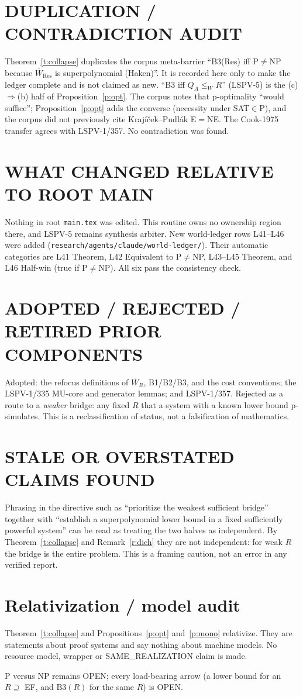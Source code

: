 \documentclass[11pt]{article}
\theoremstyle{definition}
\theoremstyle{remark}
\newcommand{\Wbar}{\overline{W}}
\begin{document}
\section*{DUPLICATION / CONTRADICTION AUDIT}
Theorem~\ref{t:collapse} duplicates the corpus meta-barrier ``B3(Res) iff P$\ne$NP because $\Wbar_{\mathrm{Res}}$ is superpolynomial (Haken)''. It is recorded here only to make the ledger complete and is not claimed as new. ``B3 iff $Q_A\le_W R$'' (LSPV-5) is the (c)$\Rightarrow$(b) half of Proposition~\ref{p:opt}. The corpus notes that p-optimality ``would suffice''; Proposition~\ref{p:opt} adds the converse (necessity under SAT$\in$P), and the corpus did not previously cite Krajíček--Pudlák E$=$NE. The Cook-1975 transfer agrees with LSPV-1/357. No contradiction was found.

\section*{WHAT CHANGED RELATIVE TO ROOT MAIN}
Nothing in root \texttt{main.tex} was edited. This routine owns no ownership region there, and LSPV-5 remains synthesis arbiter. New world-ledger rows L41--L46 were added (\texttt{research/agents/claude/world-ledger/}). Their automatic categories are L41 Theorem, L42 Equivalent to P$\ne$NP, L43--L45 Theorem, and L46 Half-win (true if P$\ne$NP). All six pass the consistency check.

\section*{ADOPTED / REJECTED / RETIRED PRIOR COMPONENTS}
Adopted: the refocus definitions of $\Wbar_R$, B1/B2/B3, and the cost conventions; the LSPV-1/335 MU-core and generator lemmas; and LSPV-1/357. Rejected as a route to a \emph{weaker} bridge: any fixed $R$ that a system with a known lower bound p-simulates. This is a reclassification of status, not a falsification of mathematics.

\section*{STALE OR OVERSTATED CLAIMS FOUND}
Phrasing in the directive such as ``prioritize the weakest sufficient bridge'' together with ``establish a superpolynomial lower bound in a fixed sufficiently powerful system'' can be read as treating the two halves as independent. By Theorem~\ref{t:collapse} and Remark~\ref{r:dich} they are not independent: for weak $R$ the bridge is the entire problem. This is a framing caution, not an error in any verified report.

\section*{Relativization / model audit}
Theorem~\ref{t:collapse} and Propositions~\ref{p:opt} and~\ref{p:mono} relativize. They are statements about proof systems and say nothing about machine models. No resource model, wrapper or SAME\_REALIZATION claim is made.

\noindent P versus NP remains OPEN; every load-bearing arrow (a lower bound for an $R\supseteq$ EF, and $\mathrm{B3}(R)$ for the same $R$) is OPEN.
\end{document}
